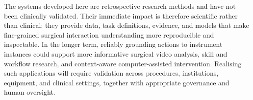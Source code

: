 The systems developed here are retrospective research methods and have not been clinically validated. Their immediate impact is therefore scientific rather than clinical: they provide data, task definitions, evidence, and models that make fine-grained surgical interaction understanding more reproducible and inspectable. In the longer term, reliably grounding actions to instrument instances could support more informative surgical video analysis, skill and workflow research, and context-aware computer-assisted intervention. Realising such applications will require validation across procedures, institutions, equipment, and clinical settings, together with appropriate governance and human oversight.
